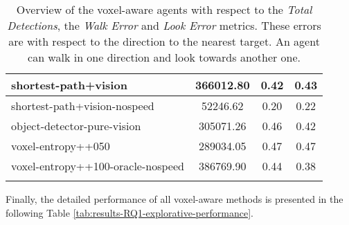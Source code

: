 \begin{longtable}{|l|c|c|c|}
shortest-path+vision & 366012.80 & {\cellcolor[HTML]{CCE3DE}} \color[HTML]{000000} 0.42 & {\cellcolor[HTML]{D2E6E2}} \color[HTML]{000000} 0.43 \\ \hline
shortest-path+vision-nospeed & 52246.62 & {\cellcolor[HTML]{55AA99}} \color[HTML]{000000} 0.20 & {\cellcolor[HTML]{55AA99}} \color[HTML]{000000} 0.22 \\ \hline
object-detector-pure-vision & 305071.26 & {\cellcolor[HTML]{DEECE9}} \color[HTML]{000000} 0.46 & {\cellcolor[HTML]{C9E2DC}} \color[HTML]{000000} 0.42 \\ \hline
voxel-entropy++050 & 289034.05 & {\cellcolor[HTML]{E3EFEC}} \color[HTML]{000000} 0.47 & {\cellcolor[HTML]{E7F0EE}} \color[HTML]{000000} 0.47 \\ \hline
voxel-entropy++100-oracle-nospeed & 386769.90 & {\cellcolor[HTML]{D5E8E4}} \color[HTML]{000000} 0.44 & {\cellcolor[HTML]{B6D8D1}} \color[HTML]{000000} 0.38 \\ \hline

    \caption{Overview of the voxel-aware agents with respect to the \textit{Total Detections}, the \textit{Walk Error} and \textit{Look Error} metrics.
    These errors are with respect to the direction to the nearest target. An agent can walk in one direction and look towards another one.
    }
    \label{tab:results-RQ1-walkLook}
\end{longtable}

Finally, the detailed performance of all voxel-aware methods is presented in the following Table \ref{tab:results-RQ1-explorative-performance}. 


